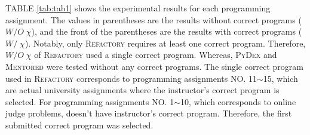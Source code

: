 \documentclass[10pt,conference]{IEEEtran}
\begin{document}
        TABLE \ref{tab:tab1} shows the experimental results for each programming assignment. The values in parentheses are the results without correct programs ($W/O\;\chi$), and the front of the parentheses are the results with correct programs ($W/\;\chi$). Notably, only \textsc{Refactory} requires at least one correct program. Therefore, $W/O\;\chi$ of \textsc{Refactory} used a single correct program. Whereas, \textsc{PyDex} and \textsc{Mentored} were tested without any correct programs. The single correct program used in \textsc{Refactory} corresponds to programming assignments NO. 11$\sim$15, which are actual university assignments where the instructor's correct program is selected. For programming assignments NO. 1$\sim$10, which corresponds to online judge problems, doesn't have instructor's correct program. Therefore, the first submitted correct program was selected.
\end{document}

